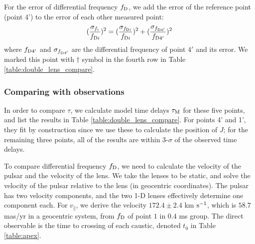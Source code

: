 \documentclass[useAMS,usenatbib]{mn2e}
\begin{document}
For the error of differential frequency $f_{\rm D}$, we add the error of the reference point (point 4') to the error of each other measured point:
\begin{equation}
\begin{aligned}
(\frac{\sigma_{f_i}}{f_{{\rm D}i}})^2=(\frac{\sigma_{f_{{\rm D}i}}}{f_{{\rm D}i}})^2+(\frac{\sigma_{f_{{\rm D}4'}}}{f_{{\rm D}4'}})^2
\end{aligned}
\end{equation}
where $f_{{\rm D}4'}$ and $\sigma_{f_{{\rm D}4'}}$ are the differential frequency of point $4'$
and its error.  We marked this point with $\dagger$ symbol in the fourth row in Table
\ref{table:double_lens_compare}.

\subsubsection{Comparing with observations}
In order to compare $\tau$, we calculate model time delays $\tau_{\rm M}$ for these five
points, and list the results in Table
\ref{table:double_lens_compare}.  For points 4' and 1', they fit by
construction since we use these to calculate the position of $J$; for the remaining three points, all of the results are within 3-$\sigma$ of the observed time delays.

To compare differential frequency $f_{\rm D}$, we need to calculate the velocity of the pulsar and the velocity of the lens. We take the lenses to be static, and solve the velocity of the pulsar relative to the lens (in geocentric coordinates).  The pulsar has two velocity components, and the two 1-D lenses effectively determine one component each.
For $v_{\parallel}$, we derive the velocity $172.4 \pm 2.4$ km $\rm s^{-1}$, 
which is $58.7$ mas/yr in a geocentric system, 
from $f_{\rm D}$ of point $1$ in $0.4$ ms group.  The direct observable is the time to crossing of each caustic, denoted $t_0$ in Table \ref{table:apex}. 
\end{document}
